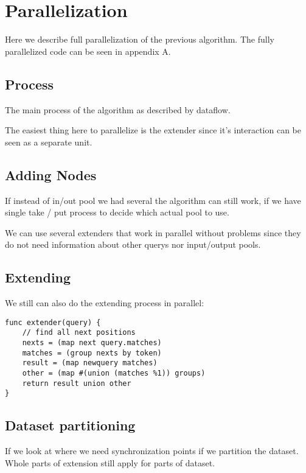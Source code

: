 \chapter{Parallelization}

Here we describe full parallelization of the previous 
algorithm. The fully parallelized code can be seen in appendix A.

\section{Process}

The main process of the algorithm as described by dataflow.\cite{Kahn74,Lee95}

\begin{figure}[H]
	
\end{figure}

The easiest thing here to parallelize is the extender since it's interaction
can be seen as a separate unit.

\section{Adding Nodes}

If instead of in/out pool we had several the algorithm can still work, if we
have single take / put process to decide which actual pool to use.

We can use several extenders that work in parallel without problems since they do not need information about other querys nor input/output pools.

\section{Extending}

We still can also do the extending process in parallel:

\begin{verbatim}
func extender(query) {
	// find all next positions
	nexts = (map next query.matches)
	matches = (group nexts by token)
	result = (map newquery matches)
	other = (map #(union (matches %1)) groups)
	return result union other
}
\end{verbatim}

\section{Dataset partitioning}

If we look at where we need synchronization points if we partition the dataset. Whole parts of extension still apply for parts of dataset.

